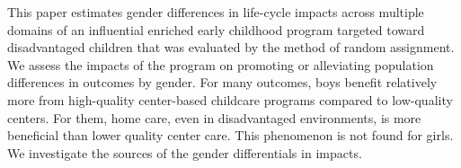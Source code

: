 \noindent This paper estimates gender differences in life-cycle impacts across multiple domains of an influential enriched early childhood program targeted toward disadvantaged children that was evaluated by the method of random assignment. We assess the impacts of the program on promoting or alleviating population differences in outcomes by gender. For many outcomes, boys benefit relatively more from high-quality center-based childcare programs compared to low-quality centers. For them, home care, even in disadvantaged environments, is more beneficial than lower quality center care. This phenomenon is not found for girls. We investigate the sources of the gender differentials in impacts. 